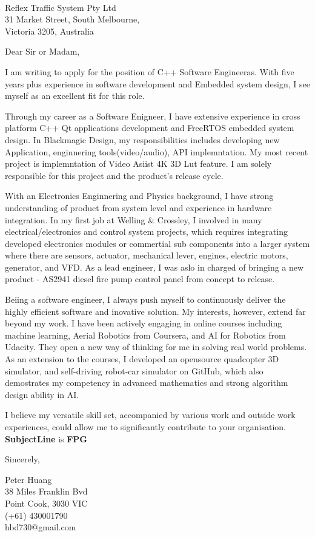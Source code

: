 \documentclass{letter}
\begin{document}
\begin{letter}{\\
Reflex Traffic System Pty Ltd\\
31 Market Street, South Melbourne,\\
Victoria 3205, Australia}

\opening{Dear Sir or Madam,}
I am writing to apply for the position of C++ Software Engineeras. With five years plus experience in software development and Embedded system design, I see myself as an excellent fit for this role.

Through my career as a Software Enigneer, I have extensive experience in cross platform C++ Qt applications development and FreeRTOS embedded system design. In Blackmagic Design, my responsibilities includes developing new Application, enginnering tools(video/audio), API implemntation. My most recent project is implemntation of Video Asiist 4K 3D Lut feature. I am solely responsible for this project and the product's release cycle.

With an Electronics Enginnering and Physics background, I have strong understanding of product from system level and experience in hardware integration. In my first job at Welling \& Crossley, I involved in many electrical/electronics and control system projects, which requires integrating developed electronics modules or commertial sub components into a larger system where there are sensors, actuator, mechanical lever, engines, electric motors, generator, and VFD. As a lead engineer, I was aslo in charged of bringing a new product - AS2941 diesel fire pump control panel from concept to release. 

Beiing a software engineer, I always push myself to continuously deliver the highly efficient software and inovative solution. My interests, however, extend far beyond my work. I have been actively engaging in online courses including  
machine learning, Aerial Robotics from Coursera, and AI for Robotics from Udacity. They open a new way of thinking for me in solving real world problems. As an extension to the courses, I developed an opensource quadcopter 3D simulator, and self-driving robot-car simulator on GitHub, which also demostrates my competency in advanced mathematics and strong algorithm design ability in AI.     

I believe my versatile skill set, accompanied by various work and outside work experiences, could allow me to significantly contribute to your organisation. \textbf{SubjectLine} is \textbf{FPG}

\closing{Sincerely,}
Peter Huang\\
38 Miles Franklin Bvd\\
Point Cook, 3030 VIC\\
(+61) 430001790 \\hbd730@gmail.com\\

\end{letter}
\end{document}
